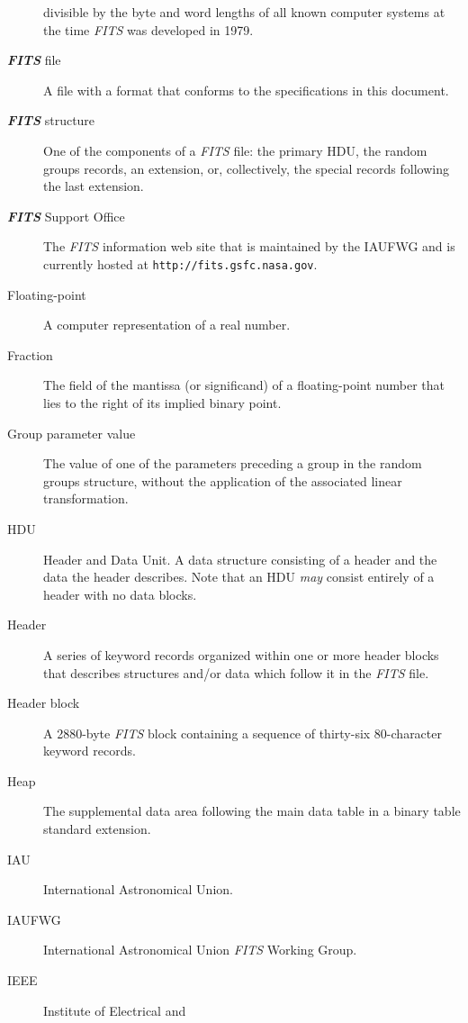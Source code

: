\documentclass[11pt,makeidx]{book}     %
\begin{document}
\begin{description}
divisible by the byte and word lengths of all known computer systems at the time
{\em FITS\/} was developed in 1979.
\item[{\em\bf FITS} file] A file with a format that conforms to the 
            specifications in this document.
\item[{\em\bf FITS} structure] One of the 
               components of a {\em FITS\/} file: 
               the primary HDU, 
               the random groups records, an 
               extension, or, collectively, 
               the special records following 
               the last extension.
\item[{\em\bf FITS} Support Office] The {\em FITS\/} information
web site that is maintained by the IAUFWG and is currently hosted
at {\tt http://fits.gsfc.nasa.gov}.
\item[Floating-point] A computer representation of a real number.
\item[Fraction]The field of the mantissa
              (or significand) of a floating-point number that lies to
              the right of its implied binary point.   
\item[Group parameter value] The 
     value of one of the parameters preceding a group in the random groups
     structure, without the application of the 
     associated linear transformation.
\item[HDU] Header and Data Unit. A data structure 
       consisting of a
       header and the data the header describes. Note that an
       HDU {\em may} consist entirely of a header with no data blocks.
\item[Header] A series of keyword records organized within 
       one or more 
       header blocks that describes structures 
       and/or data which follow it in the {\em FITS\/} file.
\item[Header block]  A 2880-byte {\em FITS\/} block containing a sequence of thirty-six 
80-character keyword records. 
\item[Heap] The supplemental data area following the main data table in 
       a binary table standard extension.
\item[IAU] International Astronomical Union.
\item[IAUFWG] 
       International Astronomical Union {\em FITS\/} Working Group.
\item[IEEE] Institute of Electrical and 

\end{description}
\end{document}
